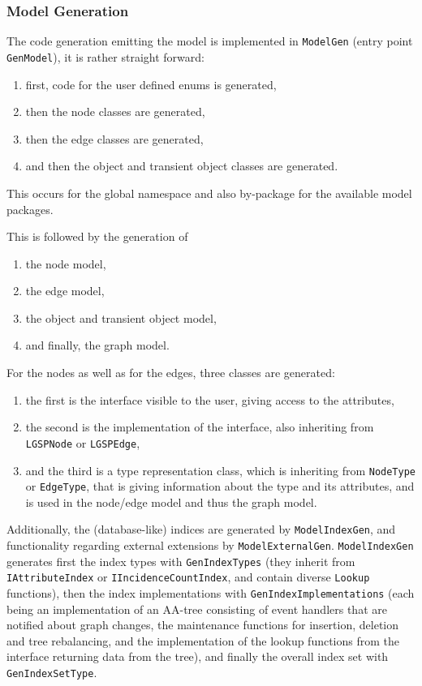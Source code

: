 \subsubsection*{Model Generation}


The code generation emitting the model is implemented in \texttt{Model\-Gen} (entry point \texttt{Gen\-Model}), it is rather straight forward:
\begin{enumerate}
	\item first, code for the user defined enums is generated,
	\item then the node classes are generated,
	\item then the edge classes are generated,
	\item and then the object and transient object classes are generated.
\end{enumerate}
This occurs for the global namespace and also by-package for the available model packages.

\noindent This is followed by the generation of
\begin{enumerate}
	\item the node model,
	\item the edge model,
	\item the object and transient object model,
	\item and finally, the graph model.
\end{enumerate}

\noindent For the nodes as well as for the edges, three classes are generated:
\begin{enumerate}
	\item the first is the interface visible to the user, giving access to the attributes,
	\item the second is the implementation of the interface, also inheriting from \texttt{LGSPNode} or \texttt{LGSPEdge},
	\item and the third is a type representation class, which is inheriting from \texttt{NodeType} or \texttt{EdgeType}, that is giving information about the type and its attributes, and is used in the node/edge model and thus the graph model.
\end{enumerate}

Additionally, the (database-like) indices are generated by \texttt{Model\-Index\-Gen}, and functionality regarding external extensions by \texttt{Model\-External\-Gen}.
\texttt{Model\-Index\-Gen} generates first the index types with \texttt{Gen\-Index\-Types} (they inherit from \texttt{IAttribute\-Index} or \texttt{IIncidence\-Count\-Index}, and contain diverse \texttt{Lookup} functions), then the index implementations with \texttt{Gen\-Index\-Implementations} (each being an implementation of an AA-tree consisting of event handlers that are notified about graph changes, the maintenance functions for insertion, deletion and tree rebalancing, and the implementation of the lookup functions from the interface returning data from the tree), and finally the overall index set with \texttt{Gen\-Index\-Set\-Type}.


